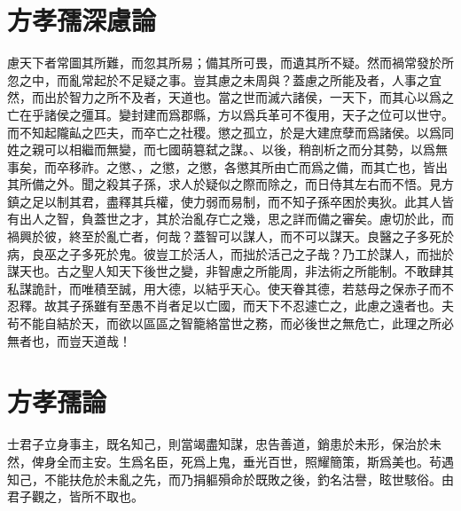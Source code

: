 \section[深慮論\quad{\small 方孝孺}]{{\normalsize 方孝孺}\quad 深慮論}
慮天下者常圖其所難，而忽其所易；備其所可畏，而遺其所不疑。然而禍常發於所忽之中，而亂常起於不足疑之事。豈其慮之未周與？蓋慮之所能及者，人事之宜然，而出於智力之所不及者，天道也。當之世而滅{六}諸侯，一天下，而其心以爲之亡在乎諸侯之彊耳。變封建而爲郡縣，方以爲兵革可不復用，天子之位可以世守。而不知起隴畆之{匹夫}，而卒亡之社稷。懲之孤立，於是大建庶孽而爲諸侯。以爲同姓之親可以相繼而無變，而七國萌簒弑之謀。、以後，稍剖析之而分其勢，以爲無事矣，而卒移祚。之懲、，之懲，之懲，各懲其所由亡而爲之備，而其亡也，{皆出其}所備之外。聞之殺其子孫，求人於疑似之際而除之，而日侍其左右而不悟。見方鎮之足以制其君，盡釋其兵權，使力弱而易制，而不知子孫卒困於{夷狄}。此其人皆有出人之智，{負}蓋世之才，其於治亂存亡之幾，思之詳而備之審矣。慮切於此，而禍興於彼，終至於亂亡者，何哉？蓋智可以謀人，而不可以謀天。良醫之子多死於病，良巫之子多死於鬼。{彼}豈工於活人，而拙於{活己之子}哉？乃工於謀人，而拙於謀天也。古之聖人知天下後世之變，非智慮之所能周，非法術之所能制。不敢肆其私謀詭計，而唯積至誠，用大德，以結乎天心。使天眷其德，若慈母之保赤子而不忍釋。故其子孫雖有至愚不肖者足以亡國，而天{下}不忍遽亡之，此慮之遠者也。夫茍不能自結於天，而欲以區區之智籠絡當世之務，而必後世之無危亡，此理之所必無者也，而豈天道哉！%

\theendnotes

\section[豫讓論\quad{\small 方孝孺}]{{\normalsize 方孝孺}\quad {}論}
士君子立身事主，既名知己，則當竭盡知謀，忠告善道，銷患於未形，保治於未然，俾身全而主安。生爲名臣，死爲上鬼，垂光百世，照耀簡策，斯爲美也。茍遇知己，不能扶危於未亂之先，而乃捐軀殞命於既敗之後，釣名沽譽，眩世{駭}俗。由君子觀之，皆所不取也。%


